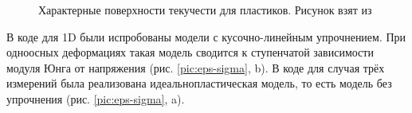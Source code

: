 \begin{figure}[h]
\caption{Характерные поверхности текучести для пластиков. Рисунок взят из \cite{resler}}
\label{pic:plastic-tekuchest}
\end{figure}

В коде для 1D были испробованы модели с кусочно-линейным упрочнением. При одноосных деформациях такая модель сводится к ступенчатой зависимости модуля Юнга от напряжения (рис. \ref{pic:eps-sigma}, b). В коде для случая трёх измерений была реализована идеальнопластическая модель, то есть модель без упрочнения (рис. \ref{pic:eps-sigma}, a). 
 